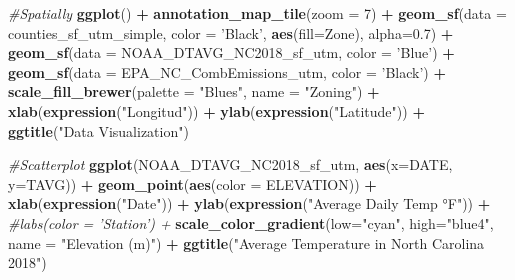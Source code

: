 \documentclass[12pt,]{article}
\newenvironment{Shaded}{\begin{snugshade}}{\end{snugshade}}
\newcommand{\KeywordTok}[1]{\textcolor[rgb]{0.13,0.29,0.53}{\textbf{#1}}}
\newcommand{\DataTypeTok}[1]{\textcolor[rgb]{0.13,0.29,0.53}{#1}}
\newcommand{\DecValTok}[1]{\textcolor[rgb]{0.00,0.00,0.81}{#1}}
\newcommand{\FloatTok}[1]{\textcolor[rgb]{0.00,0.00,0.81}{#1}}
\newcommand{\StringTok}[1]{\textcolor[rgb]{0.31,0.60,0.02}{#1}}
\newcommand{\CommentTok}[1]{\textcolor[rgb]{0.56,0.35,0.01}{\textit{#1}}}
\newcommand{\OperatorTok}[1]{\textcolor[rgb]{0.81,0.36,0.00}{\textbf{#1}}}
\newcommand{\NormalTok}[1]{#1}
\begin{document}
\begin{Shaded}
\begin{Highlighting}[]
\CommentTok{#Spatially}
\KeywordTok{ggplot}\NormalTok{() }\OperatorTok{+}\StringTok{ }
\StringTok{  }\KeywordTok{annotation_map_tile}\NormalTok{(}\DataTypeTok{zoom =} \DecValTok{7}\NormalTok{) }\OperatorTok{+}
\StringTok{  }\KeywordTok{geom_sf}\NormalTok{(}\DataTypeTok{data =}\NormalTok{ counties_sf_utm_simple, }\DataTypeTok{color =} \StringTok{'Black'}\NormalTok{, }\KeywordTok{aes}\NormalTok{(}\DataTypeTok{fill=}\NormalTok{Zone), }\DataTypeTok{alpha=}\FloatTok{0.7}\NormalTok{) }\OperatorTok{+}\StringTok{ }
\StringTok{  }\KeywordTok{geom_sf}\NormalTok{(}\DataTypeTok{data =}\NormalTok{ NOAA_DTAVG_NC2018_sf_utm, }\DataTypeTok{color =} \StringTok{'Blue'}\NormalTok{) }\OperatorTok{+}
\StringTok{  }\KeywordTok{geom_sf}\NormalTok{(}\DataTypeTok{data =}\NormalTok{ EPA_NC_CombEmissions_utm, }\DataTypeTok{color =} \StringTok{'Black'}\NormalTok{) }\OperatorTok{+}
\StringTok{  }\KeywordTok{scale_fill_brewer}\NormalTok{(}\DataTypeTok{palette =} \StringTok{"Blues"}\NormalTok{, }\DataTypeTok{name =} \StringTok{"Zoning"}\NormalTok{)  }\OperatorTok{+}
\StringTok{  }\KeywordTok{xlab}\NormalTok{(}\KeywordTok{expression}\NormalTok{(}\StringTok{"Longitud"}\NormalTok{)) }\OperatorTok{+}
\StringTok{  }\KeywordTok{ylab}\NormalTok{(}\KeywordTok{expression}\NormalTok{(}\StringTok{"Latitude"}\NormalTok{)) }\OperatorTok{+}
\StringTok{  }\KeywordTok{ggtitle}\NormalTok{(}\StringTok{"Data Visualization"}\NormalTok{)}

\CommentTok{#Scatterplot}
\KeywordTok{ggplot}\NormalTok{(NOAA_DTAVG_NC2018_sf_utm, }\KeywordTok{aes}\NormalTok{(}\DataTypeTok{x=}\NormalTok{DATE, }\DataTypeTok{y=}\NormalTok{TAVG)) }\OperatorTok{+}
\StringTok{  }\KeywordTok{geom_point}\NormalTok{(}\KeywordTok{aes}\NormalTok{(}\DataTypeTok{color =}\NormalTok{ ELEVATION)) }\OperatorTok{+}
\StringTok{  }\KeywordTok{xlab}\NormalTok{(}\KeywordTok{expression}\NormalTok{(}\StringTok{"Date"}\NormalTok{)) }\OperatorTok{+}
\StringTok{  }\KeywordTok{ylab}\NormalTok{(}\KeywordTok{expression}\NormalTok{(}\StringTok{"Average Daily Temp °F"}\NormalTok{)) }\OperatorTok{+}
\StringTok{  }\CommentTok{#labs(color = 'Station') +}
\StringTok{  }\KeywordTok{scale_color_gradient}\NormalTok{(}\DataTypeTok{low=}\StringTok{"cyan"}\NormalTok{, }\DataTypeTok{high=}\StringTok{"blue4"}\NormalTok{, }\DataTypeTok{name =} \StringTok{"Elevation (m)"}\NormalTok{)  }\OperatorTok{+}
\StringTok{  }\KeywordTok{ggtitle}\NormalTok{(}\StringTok{"Average Temperature in North Carolina 2018"}\NormalTok{)}


\end{Highlighting}
\end{Shaded}
\end{document}
